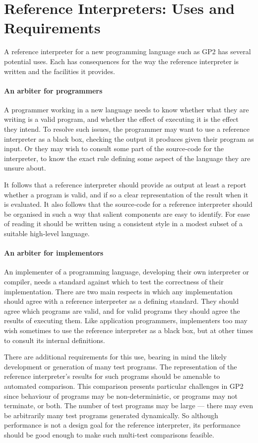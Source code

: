 \section{Reference Interpreters: Uses and Requirements}
\label{sec:usesrequirements}

A reference interpreter for a new programming language such as GP2
has several potential uses.
Each has consequences for the
way the reference interpreter is written and the
facilities it provides.

\paragraph{An arbiter for programmers}
A programmer working in a new language needs to
know whether what they are writing is a valid
program, and whether the effect of executing it
is the effect they intend.
To resolve such issues, the programmer may want to
use a reference interpreter as a black box,
checking the output it produces given their
program as input.
Or they may wish to consult some part of the
source-code for the interpreter, to know the exact
rule defining some aspect of the language they
are unsure about.

It follows that a reference interpreter should
provide as output at least a report whether a
program is valid, and if so a clear representation
of the result when it is evaluated.
It also follows that the source-code for a
reference interpreter should
be organised in such a way that salient components
are easy to identify.
For ease of reading it should be written using a
consistent style in a modest subset of a suitable
high-level language.

\paragraph{An arbiter for implementors}
An implementer of a programming language,
developing their own interpreter or compiler,
needs a standard against which to test the correctness
of their implementation.
There are two main respects in which any
implementation should agree with a reference interpreter
as a defining standard.
They should agree which programs are valid,
and for valid programs they should agree the results
of executing them.
Like application programmers, implementers too may
wish sometimes to use the reference interpreter as
a black box, but at other times to consult its
internal definitions. 

There are additional requirements for this use,
bearing in mind the likely development or generation
of many test programs.
The representation of the
reference interpreter's results for such programs
should be amenable to automated comparison.
This comparison presents particular challenges in GP2 since
behaviour of programs may be non-deterministic,
or programs may not terminate, or both.
The number of test programs may be large
--- there may even be arbitrarily many test programs generated dynamically.
So although performance is not a design goal for the reference
interpreter, its performance should be good enough to
make such multi-test comparisons feasible.

